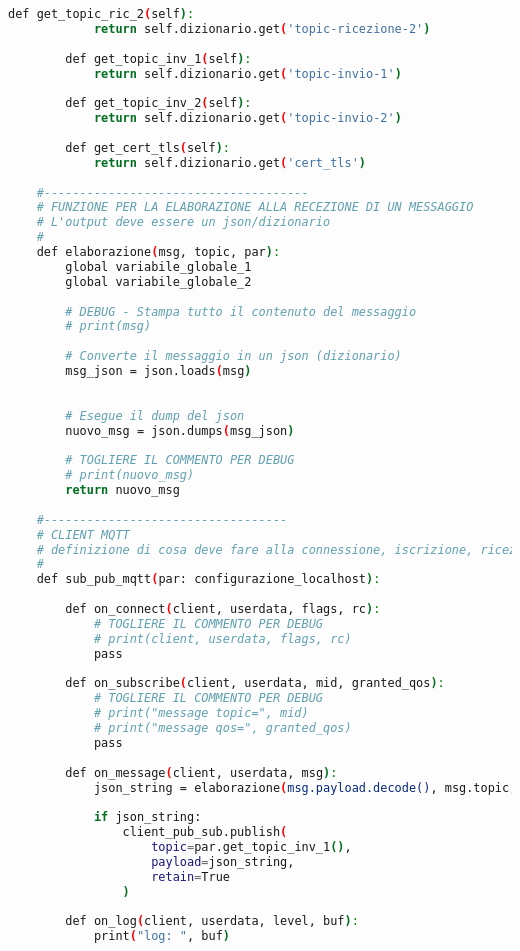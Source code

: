 \begin{lstlisting}[language=bash]
        def get_topic_ric_2(self):
            return self.dizionario.get('topic-ricezione-2')
        
        def get_topic_inv_1(self):
            return self.dizionario.get('topic-invio-1')
        
        def get_topic_inv_2(self):
            return self.dizionario.get('topic-invio-2')
        
        def get_cert_tls(self):
            return self.dizionario.get('cert_tls')
    
    #-------------------------------------
    # FUNZIONE PER LA ELABORAZIONE ALLA RECEZIONE DI UN MESSAGGIO
    # L'output deve essere un json/dizionario
    #
    def elaborazione(msg, topic, par):
        global variabile_globale_1
        global variabile_globale_2
        
        # DEBUG - Stampa tutto il contenuto del messaggio
        # print(msg)
        
        # Converte il messaggio in un json (dizionario)
        msg_json = json.loads(msg)
    
    
        # Esegue il dump del json
        nuovo_msg = json.dumps(msg_json)
        
        # TOGLIERE IL COMMENTO PER DEBUG
        # print(nuovo_msg) 
        return nuovo_msg
    
    #----------------------------------
    # CLIENT MQTT
    # definizione di cosa deve fare alla connessione, iscrizione, ricezione, invio, log
    #
    def sub_pub_mqtt(par: configurazione_localhost):
    
        def on_connect(client, userdata, flags, rc):
            # TOGLIERE IL COMMENTO PER DEBUG
            # print(client, userdata, flags, rc)
            pass
    
        def on_subscribe(client, userdata, mid, granted_qos):
            # TOGLIERE IL COMMENTO PER DEBUG
            # print("message topic=", mid)
            # print("message qos=", granted_qos)
            pass
    
        def on_message(client, userdata, msg):
            json_string = elaborazione(msg.payload.decode(), msg.topic, par)
    
            if json_string:  
                client_pub_sub.publish(
                    topic=par.get_topic_inv_1(),
                    payload=json_string,
                    retain=True
                )        
    
        def on_log(client, userdata, level, buf):
            print("log: ", buf)
    

\end{lstlisting}
